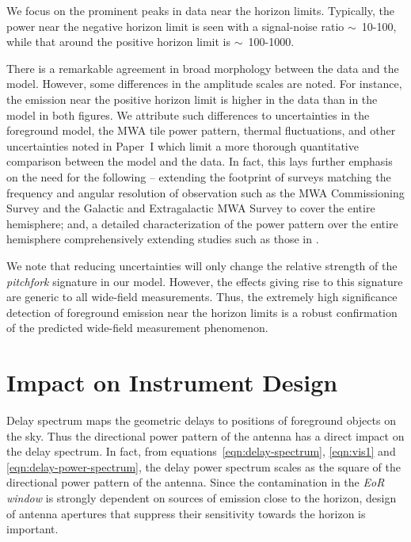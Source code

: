 \documentclass[preprint2,apjl,numberedappendix,twocolappendix,appendixfloats]{emulateapj}
\begin{document}
We focus on the prominent peaks in data near the horizon limits. Typically, the power near the negative horizon limit is seen with a signal-noise ratio $\sim$~10-100, while that around the positive horizon limit is $\sim$~100-1000. 

There is a remarkable agreement in broad morphology between the data and the model. However, some differences in the amplitude scales are noted. For instance, the emission near the positive horizon limit is higher in the data than in the model in both figures. We attribute such differences to uncertainties in the foreground model, the MWA tile power pattern, thermal fluctuations, and other uncertainties noted in Paper~I which limit a more thorough quantitative comparison between the model and the data. In fact, this lays further emphasis on the need for the following -- extending the footprint of surveys matching the frequency and angular resolution of observation such as the MWA Commissioning Survey \citep[MWACS;][]{hur14} and the Galactic and Extragalactic MWA Survey \citep[GLEAM;][]{way15} to cover the entire hemisphere; and, a detailed characterization of the power pattern over the entire hemisphere comprehensively extending studies such as those in \citet{neb15}.

We note that reducing uncertainties will only change the relative strength of the {\it pitchfork} signature in our model. However, the effects giving rise to this signature are generic to all wide-field measurements. Thus, the extremely high significance detection of foreground emission near the horizon limits is a robust confirmation of the predicted wide-field measurement phenomenon.

\section{Impact on Instrument Design}\label{sec:impact}

Delay spectrum maps the geometric delays to positions of foreground objects on the sky. Thus the directional power pattern of the antenna has a direct impact on the delay spectrum. In fact, from equations~\ref{eqn:delay-spectrum}, \ref{eqn:vis1} and \ref{eqn:delay-power-spectrum}, the delay power spectrum scales as the square of the directional power pattern of the antenna. Since the contamination in the {\it EoR window} is strongly dependent on sources of emission close to the horizon, design of antenna apertures that suppress their sensitivity towards the horizon is important. 
\end{document}
